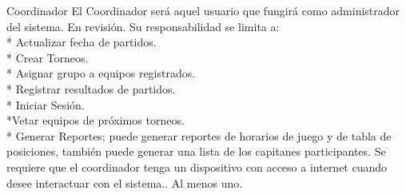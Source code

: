 \begin{Actor}{Coordinador} 
	\BRitem[Descripción:] El Coordinador será aquel usuario que fungirá como administrador del sistema.
	\BRitem[Estatus:] En revisión.
	\BRitem[Responsabilidades:] Su responsabilidad se limita a: \\
	\** Actualizar fecha de partidos.\\
	\** Crear Torneos.\\
	\** Asignar grupo a equipos registrados.\\
	\** Registrar resultados de partidos. \\
	\** Iniciar Sesión.\\
	\**Vetar equipos de próximos torneos.\\
	\** Generar Reportes; puede generar reportes de horarios de juego y de tabla de posiciones, también puede generar una lista de los capitanes participantes.
	\BRitem[Perfil:] Se requiere que el coordinador tenga un dispositivo con acceso a internet cuando desee interactuar con el sistema..
	\BRitem[Cantidad:] Al menos uno.
\end{Actor}
\dotfill
\newline